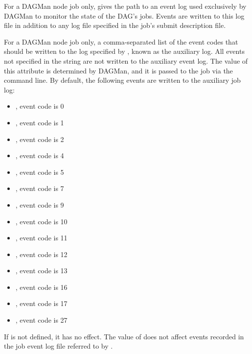 \begin{description}
\item[\AdAttr{DAGManNodesLog}:] For a DAGMan node job only, gives the path to
an event log used exclusively by DAGMan to monitor the state of the DAG's jobs.
Events are written to this log file in addition to any log file
specified in the job's submit description file.

\item[\AdAttr{DAGManNodesMask}:] For a DAGMan node job only, 
a comma-separated list of the event codes that should be written
to the log specified by , 
known as the auxiliary log.
All events not specified in the
 string are not written to the auxiliary event log.
The value of this attribute is determined
by DAGMan, and it is passed to the job via the  command line.
By default, the following events are written to the
auxiliary job log:  
\begin{itemize}
 \item {}, event code is 0
 \item {}, event code is 1
 \item {}, event code is 2
 \item {}, event code is 4
 \item {}, event code is 5
 \item {}, event code is 7
 \item {}, event code is 9
 \item {}, event code is 10
 \item {}, event code is 11
 \item {}, event code is 12
 \item {}, event code is 13
 \item {}, event code is 16
 \item {}, event code is 17
 \item {}, event code is 27
\end{itemize}
If  is
not defined, it has no effect. The value of  does not
affect events recorded in the job event log file referred to by .


\end{description}
